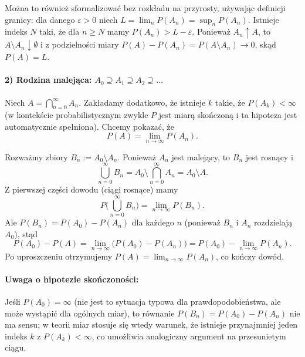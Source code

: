 Można to również sformalizować bez rozkładu na przyrosty, używając definicji granicy: dla danego \(\varepsilon>0\) niech \(L=\lim_{n}P(A_n)=\sup_n P(A_n)\). Istnieje indeks \(N\) taki, że dla \(n\ge N\) mamy \(P(A_n)>L-\varepsilon\). Ponieważ \(A_n\uparrow A\), to \(A\setminus A_n\downarrow\emptyset\) i z podzielności miary \(P(A)-P(A_n)=P(A\setminus A_n)\to0\), skąd \(P(A)=L\).

\paragraph{2) Rodzina malejąca: \(A_0\supseteq A_1\supseteq A_2\supseteq\ldots\)}

Niech \(A=\bigcap_{n=0}^{\infty}A_n\). Zakładamy dodatkowo, że istnieje \(k\) takie, że \(P(A_k)<\infty\) (w kontekście probabilistycznym zwykle \(P\) jest miarą skończoną i ta hipoteza jest automatycznie spełniona). Chcemy pokazać, że
\[P(A)=\lim_{n\to\infty}P(A_n).\]

Rozważmy zbiory \(B_n:=A_0\setminus A_n\). Ponieważ \(A_n\) jest malejący, to \(B_n\) jest rosnący i
\[\bigcup_{n=0}^{\infty}B_n = A_0\setminus\bigcap_{n=0}^{\infty}A_n = A_0\setminus A.\]
Z pierwszej części dowodu (ciągi rosnące) mamy
\[P\Big(\bigcup_{n=0}^{\infty}B_n\Big)=\lim_{n\to\infty}P(B_n).
\]
Ale \(P(B_n)=P(A_0)-P(A_n)\) dla każdego \(n\) (ponieważ \(B_n\) i \(A_n\) rozdzielają \(A_0\)), stąd
\[P(A_0)-P(A)=\lim_{n\to\infty}\bigl(P(A_0)-P(A_n)\bigr)=P(A_0)-\lim_{n\to\infty}P(A_n).
\]
Po uproszczeniu otrzymujemy \(P(A)=\lim_{n\to\infty}P(A_n)\), co kończy dowód.

\paragraph{Uwaga o hipotezie skończoności:} Jeśli \(P(A_0)=\infty\) (nie jest to sytuacja typowa dla prawdopodobieństwa, ale może wystąpić dla ogólnych miar), to równanie \(P(B_n)=P(A_0)-P(A_n)\) nie ma sensu; w teorii miar stosuje się wtedy warunek, że istnieje przynajmniej jeden indeks \(k\) z \(P(A_k)<\infty\), co umożliwia analogiczny argument na przesunietym ciągu.



